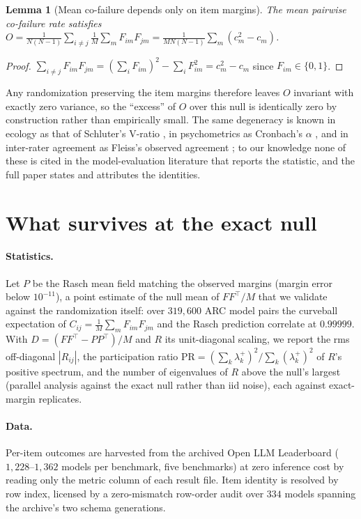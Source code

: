 \documentclass{article}
\newtheorem{lemma}{Lemma}
\begin{document}
\begin{lemma}[Mean co-failure depends only on item margins]
\label{lem:mean}
The mean pairwise co-failure rate satisfies
$O=\frac{1}{N(N-1)}\sum_{i\neq j}\frac1M\sum_m F_{im}F_{jm}=\frac{1}{MN(N-1)}\sum_m (c_m^2 - c_m)$.
\end{lemma}
\begin{proof}
$\sum_{i\neq j}F_{im}F_{jm}=(\sum_i F_{im})^2-\sum_i F_{im}^2=c_m^2-c_m$ since $F_{im}\in\{0,1\}$.
\end{proof}
\noindent Any randomization preserving the item margins therefore leaves $O$ invariant with
exactly zero variance, so the ``excess'' of $O$ over this null is identically zero by
construction rather than empirically small. The same degeneracy is known in ecology as that of
Schluter's V-ratio \citep{schluter1984,gotelli2000}, in psychometrics as Cronbach's $\alpha$
\citep{cronbach1951}, and in inter-rater agreement as Fleiss's observed agreement
\citep{fleiss1971}; to our knowledge none of these is cited in the model-evaluation literature that
reports the statistic, and the full paper states and attributes the identities.

\section{What survives at the exact null}
\label{sec:survives}

\paragraph{Statistics.} Let $P$ be the Rasch mean field matching the observed margins (margin
error below $10^{-11}$), a point estimate of the null mean of $FF^{\!\top}/M$ that we validate
against the randomization itself: over $319{,}600$ ARC model pairs the curveball expectation of
$C_{ij}=\frac1M\sum_m F_{im}F_{jm}$ and the Rasch prediction correlate at $0.99999$. With
$D=(FF^{\!\top}-PP^{\!\top})/M$ and $R$ its unit-diagonal scaling, we report the rms off-diagonal
$|R_{ij}|$, the participation ratio $\mathrm{PR}=(\sum_k\lambda_k^{+})^2/\sum_k(\lambda_k^{+})^2$ of
$R$'s positive spectrum, and the number of eigenvalues of $R$ above the null's largest (parallel
analysis against the exact null rather than iid noise), each against exact-margin replicates.

\paragraph{Data.} Per-item outcomes are harvested from the archived Open LLM Leaderboard
($1{,}228$--$1{,}362$ models per benchmark, five benchmarks) at zero inference cost by reading only
the metric column of each result file. Item identity is resolved by row index, licensed by a
zero-mismatch row-order audit over $334$ models spanning the archive's two schema generations.
\end{document}

